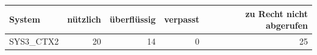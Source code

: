 \begin{tabular}{lrrrr}
\toprule
System & nützlich & überflüssig & verpasst & zu Recht nicht abgerufen \\
\midrule
SYS3\_CTX2 & 20 & 14 & 0 & 25 \\
\bottomrule
\end{tabular}
